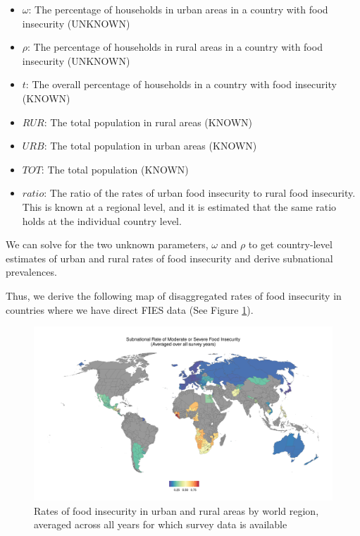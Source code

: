 \documentclass{article}
\begin{document}
\begin{itemize}
	\item $\omega$: The percentage of households in urban areas in a country with food insecurity (UNKNOWN)
	
	\item $\rho$: The percentage of households in rural areas in a country with food insecurity (UNKNOWN)
	
	\item $t$: The overall percentage of households in a country with food insecurity (KNOWN)
	
	\item $RUR$: The total population in rural areas (KNOWN)
	
	\item $URB$: The total population in urban areas (KNOWN)
	
	\item $TOT$: The total population (KNOWN)
	
	\item $ratio$: The ratio of the rates of urban food insecurity to rural food insecurity.  This is known at a regional level, and it is estimated that the same ratio holds at the individual country level.
\end{itemize}

We can solve for the two unknown parameters, $\omega$ and $\rho$ to get country-level estimates of urban and rural rates of food insecurity and derive subnational prevalences.

Thus, we derive the following map of disaggregated rates of food insecurity in countries where we have direct FIES data (See Figure \ref{fig:disaggregated}).

\begin{figure}[h]
	\centering
	\includegraphics[width=\linewidth]{../figures/subnational-moderate.png}
	\caption{Rates of food insecurity in urban and rural areas by world region, averaged across all years for which survey data is available}
	\label{fig:disaggregated}
\end{figure}
\end{document}
